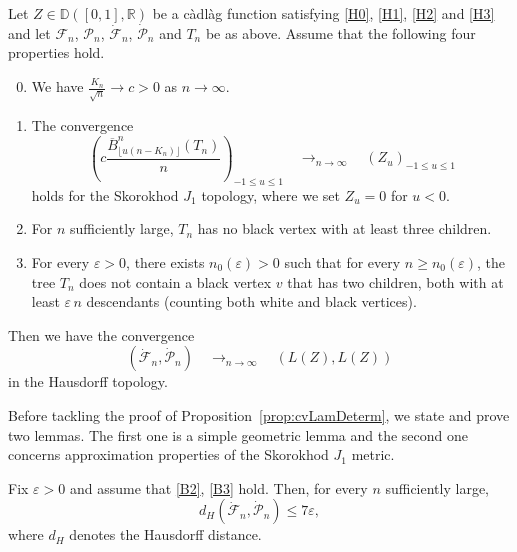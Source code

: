 \documentclass[10pt]{amsart}
\theoremstyle{definition}\newtheorem{defi}[theo]{Definition}\newtheorem{rema}[theo]{Remark}\newtheorem{exam}[theo]{Example}\newtheorem{exem}[theo]{Example}\newtheorem{nota}[theo]{Notation}
\newcommand{\R}{\mathbb{R}}
\newcommand{\D}{\mathbb{D}}
\def\eps{\varepsilon}
\def\PPP{\mathcal P}
\def\FFF{\mathcal F}
\def\dFn{\dot{\mathcal{F}}_{n}}
\def\dPn{\dot{\mathcal{P}}_{n}}
\def\oB{\overline{B}}
\renewcommand{\epsilon}{\varepsilon}
\begin{document}
\begin{proposition}
  \label{prop:cvLamDeterm} Let $Z \in {\D}([0, 1], \R)$ be a c\`adl\`ag function satisfying \ref{H0}, \ref{H1}, \ref{H2} and \ref{H3}
  and let $\FFF_{n}$, $\PPP_{n}$, $\dFn$, $\dPn$ and $T_{n}$ be as above.
  Assume that the following four properties hold.
  \begin{enumerate}[label=\color{blue}(B\arabic*)]
  \setcounter{enumi}{-1}
\item\label{B0}  We have $\tfrac{K_n}{\sqrt{n}} \rightarrow c>0$ as $n \rightarrow \infty$.
\item\label{B1} The convergence
\begin{equation}
 \left(  c \frac{\oB^{n}_{\lfloor u (n-K_{n}) \rfloor}(T_n)}{ n} \right)_{-1 \leq u \leq 1}
\quad \mathop{\longrightarrow}_{n \rightarrow \infty} \quad (Z_{u})_{- 1\leq u \leq 1}
\label{eq:cv_HB_Skorokhod}
\end{equation}
holds for the Skorokhod $J_{1}$ topology, where we set $Z_{u}=0$ for $u<0$.
\item\label{B2} For $n$ sufficiently large, $T_n$ has no black vertex  with at least three children.
\item\label{B3} For every $\eps>0$, there exists $n_0(\eps)>0$ such that  for every $n \ge n_0(\eps)$, the tree $T_n$ does not contain a black
  vertex $v$ that has two children, both with at least $\eps \, n$ descendants (counting both white and black vertices).
\end{enumerate}
Then we have the  convergence
\begin{equation}
\left(  \dFn, \dPn   \right)   \quad \mathop{\longrightarrow}_{n \rightarrow \infty} \quad ( L(Z), L(Z))
\label{eq:cv_FP_Skorokhod}
\end{equation}
in the Hausdorff topology.
\end{proposition}



Before tackling the proof of Proposition~\ref{prop:cvLamDeterm}, we state and prove two lemmas. The first one is a simple geometric lemma and the second one concerns approximation properties of the Skorokhod $J_{1}$ metric.

\begin{lemma}
\label{lem:proche}
Fix $\epsilon>0$ and assume that \ref{B2}, \ref{B3} hold. Then, for every $n$ sufficiently large,
\[d_{H}\left( \dFn  , \dPn  \right)  \leq 7\epsilon,\]
where $d_{H}$ denotes the Hausdorff distance.
\end{lemma}
\end{document}
